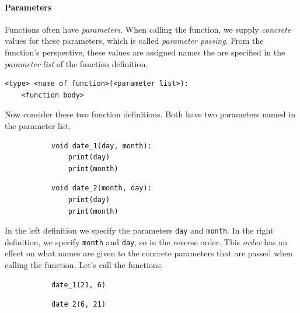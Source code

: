 \paragraph{Parameters}

Functions often have \emph{parameters}. When calling the function, we supply \emph{concrete} values for these parameters, which is called \emph{parameter passing}. From the function's perspective, these values are assigned names the are specified in the \emph{parameter list} of the function definition.

\begin{verbatim}
<type> <name of function>(<parameter list>):
    <function body>
\end{verbatim}

Now consider these two function definitions. Both have two parameters named in the parameter list.

\begin{figure}[h]
\begin{subfigure}[b]{.5\linewidth}
\begin{verbatim}
void date_1(day, month):
    print(day)
    print(month)
\end{verbatim}
\end{subfigure}
\begin{subfigure}[b]{.5\linewidth}
\begin{verbatim}
void date_2(month, day):
    print(day)
    print(month)
\end{verbatim}
\end{subfigure}
\end{figure}

In the left definition we specify the parameters \texttt{day} and \texttt{month}. In the right definition, we specify \texttt{month} and \texttt{day}, so in the reverse order. This \emph{order} has an effect on what names are given to the concrete parameters that are passed when calling the function. Let's call the functions:

\begin{figure}[h]
\begin{subfigure}[b]{.5\linewidth}
\begin{verbatim}
date_1(21, 6)
\end{verbatim}
\end{subfigure}
\begin{subfigure}[b]{.5\linewidth}
\begin{verbatim}
date_2(6, 21)
\end{verbatim}
\end{subfigure}
\end{figure}

